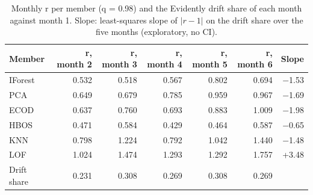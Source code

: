 \begin{table}[t]
\centering
\small
\setlength{\tabcolsep}{4pt}
\caption{Monthly r per member (q = 0.98) and the Evidently drift share of each month against month 1. Slope: least-squares slope of $|r - 1|$ on the drift share over the five months (exploratory, no CI).}
\label{tab:drift-slopes}
\begin{tabular}{lrrrrrr}
\toprule
Member & r, month 2 & r, month 3 & r, month 4 & r, month 5 & r, month 6 & Slope \\
\midrule
IForest & 0.532 & 0.518 & 0.567 & 0.802 & 0.694 & −1.53 \\
PCA & 0.649 & 0.679 & 0.785 & 0.959 & 0.967 & −1.69 \\
ECOD & 0.637 & 0.760 & 0.693 & 0.883 & 1.009 & −1.98 \\
HBOS & 0.471 & 0.584 & 0.429 & 0.464 & 0.587 & −0.65 \\
KNN & 0.798 & 1.224 & 0.792 & 1.042 & 1.440 & −1.48 \\
LOF & 1.024 & 1.474 & 1.293 & 1.292 & 1.757 & +3.48 \\
Drift share & 0.231 & 0.308 & 0.269 & 0.308 & 0.269 &  \\
\bottomrule
\end{tabular}
\end{table}
